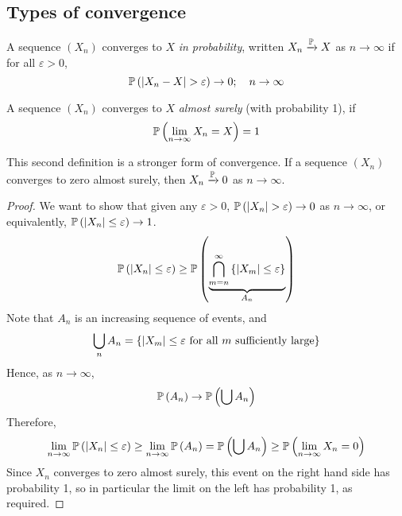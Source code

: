 \subsection{Types of convergence}
\begin{definition}
	A sequence \((X_n)\) converges to \(X\) \textit{in probability}, written \(X_n \xrightarrow{\mathbb{P}} X\) as \(n \to \infty\) if for all \(\varepsilon > 0\),
	\[
		\mathbb{P}\left({\abs{X_n - X} > \varepsilon}\right) \to 0;\quad n \to \infty
	\]
\end{definition}
\begin{definition}
	A sequence \((X_n)\) converges to \(X\) \textit{almost surely} (with probability 1), if
	\[
		\mathbb{P}\left({\lim_{n \to \infty} X_n = X }\right) = 1
	\]
\end{definition}
This second definition is a stronger form of convergence.
If a sequence \((X_n)\) converges to zero almost surely, then \(X_n \xrightarrow{\mathbb{P}} 0\) as \(n \to \infty\).
\begin{proof}
	We want to show that given any \(\varepsilon > 0\), \(\mathbb{P}\left({\abs{X_n} > \varepsilon}\right) \to 0\) as \(n \to \infty\), or equivalently, \(\mathbb{P}\left({\abs{X_n} \leq \varepsilon}\right) \to 1\).
	\[
		\mathbb{P}\left({\abs{X_n} \leq \varepsilon}\right) \geq \mathbb{P}\left({\underbrace{\bigcap_{m = n}^\infty  \qty{\abs{X_m} \leq \varepsilon}}_{A_n}}\right)
	\]
	Note that \(A_n\) is an increasing sequence of events, and
	\[
		\bigcup_n A_n = \qty{\abs{X_m} \leq \varepsilon \text{ for all } m \text{ sufficiently large}}
	\]
	Hence, as \(n \to \infty\),
	\[
		\mathbb{P}\left({A_n}\right) \to \mathbb{P}\left({\bigcup A_n}\right)
	\]
	Therefore,
	\[
		\lim_{n \to \infty} \mathbb{P}\left({\abs{X_n} \leq \varepsilon}\right) \geq \lim_{n \to \infty} \mathbb{P}\left({A_n}\right) = \mathbb{P}\left({\bigcup A_n}\right) \geq \mathbb{P}\left({\lim_{n \to \infty} X_n = 0}\right)
	\]
	Since \(X_n\) converges to zero almost surely, this event on the right hand side has probability 1, so in particular the limit on the left has probability 1, as required.
\end{proof}

